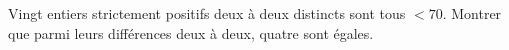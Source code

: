 Vingt entiers strictement positifs deux à deux distincts sont tous $< 70$. Montrer que parmi leurs différences deux à deux, quatre sont égales.
